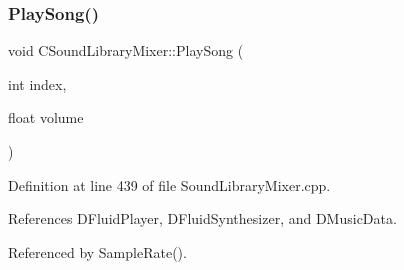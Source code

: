 \subsubsection{\texorpdfstring{Play\+Song()}{PlaySong()}}
{\footnotesize\ttfamily void C\+Sound\+Library\+Mixer\+::\+Play\+Song (\begin{DoxyParamCaption}\item[{int}]{index,  }\item[{float}]{volume }\end{DoxyParamCaption})}



Definition at line 439 of file Sound\+Library\+Mixer.\+cpp.



References D\+Fluid\+Player, D\+Fluid\+Synthesizer, and D\+Music\+Data.



Referenced by Sample\+Rate().


